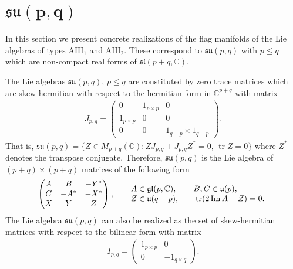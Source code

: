 \documentclass[10pt,a4paper]{amsart}
\numberwithin{equation}{section}
\newcommand{\C}{\mathbb C}
\newcommand{\func}[1]{\operatorname{#1}}
\begin{document}
\section[$\mathfrak{su}(p,q)$]{$\boldsymbol{\mathfrak{su}(p,q)}$} \label{secEsseu}

In this section we present concrete realizations of the flag manifolds of the Lie algebras of types $\mathrm{AIII}_{1}$ and $\mathrm{AIII}_{2}$. These correspond to $\mathfrak{su}(p,q)$ with $p\leq q$ which are non-compact real forms of $\mathfrak{sl}(p+q,\C)$.

The Lie algebras $\mathfrak{su}(p,q) $, $p\leq q$ are constituted by zero trace matrices which are skew-hermitian with respect to the hermitian form in $\mathbb{C}^{p+q}$ with matrix
\begin{gather*}
J_{p,q}=\left(
\begin{matrix}
0 & 1_{p\times p} & 0 \\
1_{p\times p} & 0 & 0 \\
0 & 0 & 1_{q-p}\times 1_{q-p}%
\end{matrix}
\right).
\end{gather*}
That is, $\mathfrak{su}(p,q) =\{Z\in M_{p+q} ( \mathbb{C} ) \colon ZJ_{p,q}+J_{p,q}Z^{\ast }=0,\, \operatorname{tr}Z=0\}$ where $Z^{\ast }$ denotes the transpose conjugate. Therefore, $\mathfrak{su}(p,q) $ is the Lie algebra of $(p+q) \times (p+q) $ matrices of the following form
\begin{gather}
\left(
\begin{matrix}
A & B & -Y^{\ast } \\
C & -A^{\ast } & -X^{\ast } \\
X & Y & Z%
\end{matrix}
\right), \qquad
\begin{array}{@{}l}
A\in \mathfrak{gl}(p,\mathbb{C}),\qquad B,C\in \mathfrak{u}(p), \\
Z\in \mathfrak{u}(q-p), \qquad \func{tr}(2\func{Im}A+Z)=0.
\end{array}\label{formatrizes}
\end{gather}
The Lie algebra $\mathfrak{su}(p,q) $ can also be realized as the set of skew-hermitian matrices with respect to the bilinear form with matrix
\begin{gather*}
I_{p,q}=\left(
\begin{matrix}
1_{p\times p} & 0 \\
0 & -1_{q\times q}%
\end{matrix}
\right).
\end{gather*}
\end{document}
